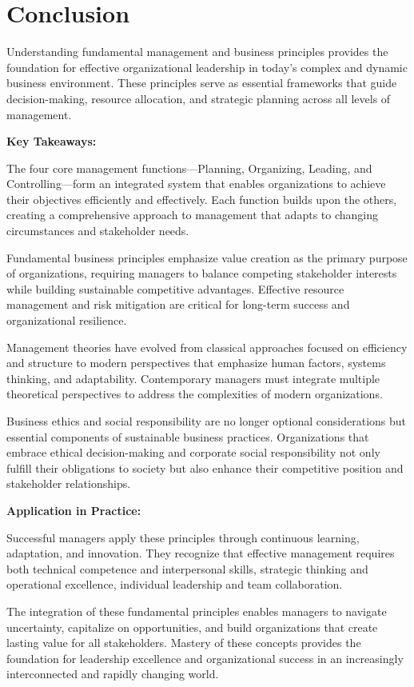 \documentclass[12pt]{article}
\begin{document}
\section{Conclusion}

Understanding fundamental management and business principles provides the foundation for effective organizational leadership in today's complex and dynamic business environment. These principles serve as essential frameworks that guide decision-making, resource allocation, and strategic planning across all levels of management.

\textbf{Key Takeaways:}

The four core management functions—Planning, Organizing, Leading, and Controlling—form an integrated system that enables organizations to achieve their objectives efficiently and effectively. Each function builds upon the others, creating a comprehensive approach to management that adapts to changing circumstances and stakeholder needs.

Fundamental business principles emphasize value creation as the primary purpose of organizations, requiring managers to balance competing stakeholder interests while building sustainable competitive advantages. Effective resource management and risk mitigation are critical for long-term success and organizational resilience.

Management theories have evolved from classical approaches focused on efficiency and structure to modern perspectives that emphasize human factors, systems thinking, and adaptability. Contemporary managers must integrate multiple theoretical perspectives to address the complexities of modern organizations.

Business ethics and social responsibility are no longer optional considerations but essential components of sustainable business practices. Organizations that embrace ethical decision-making and corporate social responsibility not only fulfill their obligations to society but also enhance their competitive position and stakeholder relationships.

\textbf{Application in Practice:}

Successful managers apply these principles through continuous learning, adaptation, and innovation. They recognize that effective management requires both technical competence and interpersonal skills, strategic thinking and operational excellence, individual leadership and team collaboration.

The integration of these fundamental principles enables managers to navigate uncertainty, capitalize on opportunities, and build organizations that create lasting value for all stakeholders. Mastery of these concepts provides the foundation for leadership excellence and organizational success in an increasingly interconnected and rapidly changing world.
\end{document}
